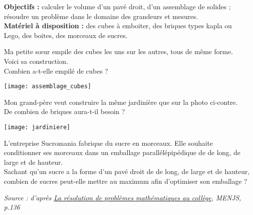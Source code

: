 \begin{activite}
   {\bf Objectifs :} calculer le volume d'un pavé droit, d'un assemblage de solides ; résoudre un problème dans le domaine des grandeurs et mesures. \\
      {\bf Matériel à disposition :} des cubes à emboiter, des briques types kapla ou Lego, des boites, des morceaux de sucres.
   \begin{QCM}
         \begin{minipage}{11.5cm}
            Ma petite sœur empile des cubes les uns sur les autres, tous de même forme. Voici sa construction. \\
            Combien a-t-elle empilé de cubes ? \\ [1.5cm]
         \end{minipage}
         \qquad
         \begin{minipage}{4.5cm}
            \texttt{[image: assemblage\_cubes]}
         \end{minipage}
         
         \begin{minipage}{9cm}
            Mon grand-père veut construire la même jardinière que sur la photo ci-contre. \\
            De combien de briques aura-t-il besoin ? \\ [2cm]
         \end{minipage}
         \qquad
         \begin{minipage}{7cm}
            \texttt{[image: jardiniere]}
         \end{minipage}
         
         L’entreprise Sucromania fabrique du sucre en morceaux. Elle souhaite conditionner ses morceaux dans un emballage parallélépipédique de  de long,  de large et  de hauteur. \\
         Sachant qu’un sucre a la forme d’un pavé droit de  de long,  de large et  de hauteur, combien de sucres peut-elle mettre au maximum afin d’optimiser son emballage ? \\ [5cm] 
   \end{QCM}
   
   \vfill \hfill {\it\footnotesize Source : d'après \href{https://eduscol.education.fr/document/13132/download}{\og La résolution de problèmes mathématiques au collège}, MENJS, p.136}
\end{activite}


